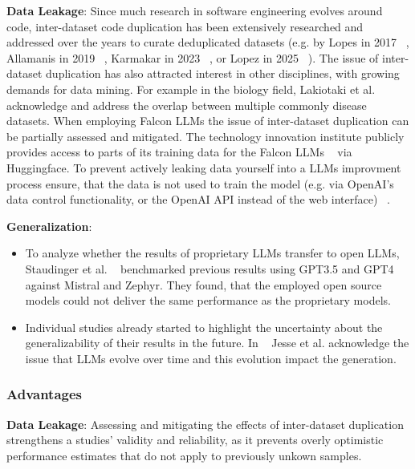 \textbf{Data Leakage}:
Since much research in software engineering evolves around code, inter-dataset code duplication has been extensively researched and addressed over the years to curate deduplicated datasets (e.g. by Lopes in 2017 ~\cite{10.1145/3133908}, Allamanis in 2019 ~\cite{10.1145/3359591.3359735}, Karmakar in 2023 ~\cite{10.1007/s10664-022-10275-7}, or Lopez in 2025 ~\cite{inter-dataset-lopez2025}).
The issue of inter-dataset duplication has also attracted interest in other disciplines, with growing demands for data mining. For example in the biology field, Lakiotaki et al. ~\cite{10.1093/database/bay011} acknowledge and address the overlap between multiple commonly disease datasets. 
When employing Falcon LLMs the issue of inter-dataset duplication can be partially assessed and mitigated. The technology innovation institute publicly provides access to parts of its training data for the Falcon LLMs ~\cite{technology_innovation_institute_2023} via Huggingface.
To prevent actively leaking data yourself into a LLMs improvment process ensure, that the data is not used to train the model (e.g. via OpenAI's data control functionality, or the OpenAI API instead of the web interface) ~\cite{balloccu-etal-2024-leak}.

\textbf{Generalization}:
\begin{itemize}
  \item To analyze whether the results of proprietary LLMs transfer to open LLMs, Staudinger et al. ~\cite{10.1145/3673791.3698432} benchmarked previous results using GPT3.5 and GPT4 against Mistral and Zephyr. They found, that the employed open source models could not deliver the same performance as the proprietary models.
  \item Individual studies already started to highlight the uncertainty about the generalizability of their results in the future. In ~\cite{10174227} Jesse et al. acknowledge the issue that LLMs evolve over time and this evolution impact the generation.
\end{itemize}



\subsubsection{Advantages}
\textbf{Data Leakage}:
Assessing and mitigating the effects of inter-dataset duplication strengthens a studies' validity and reliability, as it prevents overly optimistic performance estimates that do not apply to previously unkown samples.

